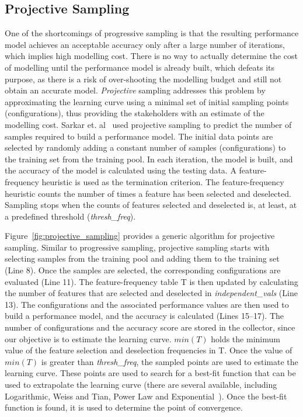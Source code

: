 \subsection{Projective Sampling}\label{sec:soa}

One of the shortcomings of progressive sampling is that the resulting 
performance model achieves an acceptable accuracy only after a large number of iterations, which implies  high modelling cost. There is no way to actually determine the cost of modelling until the performance model is already built, which defeats its purpose, as there is a risk of over-shooting the modelling budget and still not obtain an accurate model. \emph{Projective} sampling addresses this problem by approximating the learning curve using a minimal set of initial sampling points (configurations), thus providing the stakeholders with an estimate of the modelling cost. Sarkar et. al~\cite{sarkar2015cost} used projective sampling to predict the number of samples required to build a performance model. The initial data points are selected by randomly adding a constant number of samples (configurations) to the training set from the training pool. In each iteration, the model is built, and the accuracy of the model is calculated using the testing data. 
A feature-frequency heuristic is used as the termination criterion.
The feature-frequency heuristic counts the number of times a feature has been selected and deselected. Sampling stops when the counts of features selected and deselected is, at least, at a predefined threshold (\textit{thresh\_freq}).



Figure~\ref{fig:projective_sampling} provides a generic algorithm for projective sampling. Similar to progressive sampling, projective sampling starts with selecting samples from the training pool and adding them to the training set (Line 8). Once the samples are selected, the corresponding configurations are evaluated (Line 11). The feature-frequency table T is then updated by calculating the number of features that are selected and deselected in \textit{independent\_vals} (Line 13). The configurations and the associated performance values are then used to build a performance model, and the accuracy is calculated (Lines 15--17). The number of configurations and the accuracy score are stored in the collector, since our objective is to estimate the learning curve.  $min(T)$ holds the minimum value of the feature selection and deselection frequencies in T. Once the value of $min(T)$ is greater than  \textit{thresh\_freq}, the sampled points are used to estimate the learning curve. These points are used to search for a best-fit function that can be used to extrapolate the learning curve (there are several available, including Logarithmic, Weiss and Tian, Power Law and Exponential~\cite{sarkar2015cost}). Once the best-fit function is found, it is used to determine the point of convergence.


